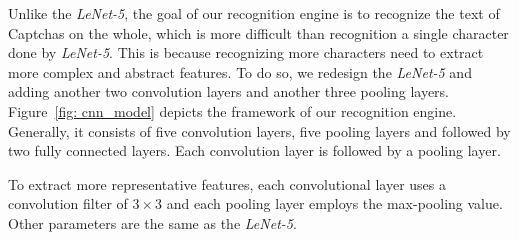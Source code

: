 Unlike the \emph{LeNet-5}, the goal of our recognition engine is to recognize the text of Captchas on the whole, which is more difficult than recognition a single character done by \emph{LeNet-5}. This is because recognizing more characters need to extract more complex and abstract features.
To do so, we redesign the \emph{LeNet-5} and adding another two convolution layers and another three pooling layers.
Figure~\ref{fig: cnn_model} depicts the framework of our recognition engine. Generally, it consists of five convolution layers, five pooling layers and followed by two fully connected layers. Each convolution layer is followed by a pooling layer.

To extract more representative features, each convolutional layer uses a convolution filter of $3 \times 3$ and each pooling layer employs the max-pooling value. Other parameters are the same as the \emph{LeNet-5}.











